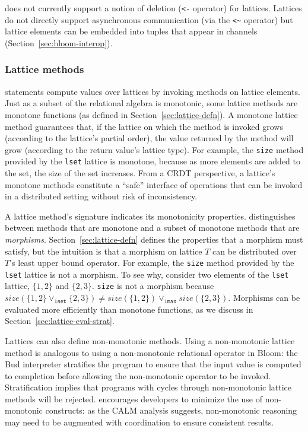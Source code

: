 \lang does not currently support a notion of deletion (\verb|<-| operator) for
lattices. Lattices do not directly support asynchronous communication (via the
\verb|<~| operator) but lattice elements can be embedded into tuples that appear
in channels (Section~\ref{sec:bloom-interop}).

\subsubsection{Lattice methods}
\lang statements compute values over lattices by invoking methods on lattice
elements. Just as a subset of the relational algebra is monotonic, some lattice
methods are monotone functions (as defined in Section~\ref{sec:lattice-defn}). A
monotone lattice method guarantees that, if the lattice on which the method is
invoked grows (according to the lattice's partial order), the value returned by
the method will grow (according to the return value's lattice type). For
example, the \texttt{size} method provided by the \texttt{lset} lattice is
monotone, because as more elements are added to the set, the size of the set
increases. From a CRDT perspective, a lattice's monotone methods constitute a
``safe'' interface of operations that can be invoked in a distributed setting
without risk of inconsistency.

A lattice method's signature indicates its monotonicity properties. \lang
distinguishes between methods that are monotone and a subset of monotone methods
that are \emph{morphisms}. Section~\ref{sec:lattice-defn} defines the properties
that a morphism must satisfy, but the intuition is that a morphism on lattice
$T$ can be distributed over $T$'s least upper bound operator. For example, the
\texttt{size} method provided by the \texttt{lset} lattice is not a morphism. To
see why, consider two elements of the \texttt{lset} lattice, $\{1,2\}$ and
$\{2,3\}$.  \texttt{size} is not a morphism because $size(\{1,2\}
\lor_{\mathtt{lset}} \{2,3\}) \ne size(\{1,2\}) \lor_{\mathtt{lmax}}
size(\{2,3\})$. Morphisms can be evaluated more efficiently than monotone
functions, as we discuss in Section~\ref{sec:lattice-eval-strat}.

Lattices can also define non-monotonic methods. Using a non-monotonic lattice
method is analogous to using a non-monotonic relational operator in Bloom: the
Bud interpreter stratifies the program to ensure that the input value is
computed to completion before allowing the non-monotonic operator to be
invoked. Stratification implies that programs with cycles through non-monotonic
lattice methods will be rejected. \lang encourages developers to minimize the
use of non-monotonic constructs: as the CALM analysis suggests, non-monotonic
reasoning may need to be augmented with coordination to ensure consistent
results.

